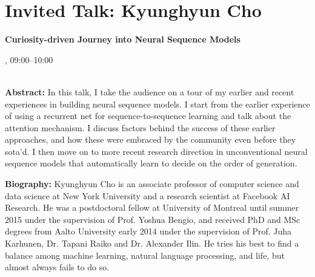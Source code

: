 \section{Invited Talk: Kyunghyun Cho}

\begin{center}
\begin{Large}
    {\bfseries\Large Curiosity-driven Journey into Neural Sequence Models} \vspace{1em}\par
\end{Large}


\daydateyear, 09:00--10:00 \vspace{1em}\\
\PlenaryLoc \\
\vspace{1em}\par
\end{center}

\noindent
{\bfseries Abstract:} In this talk, I take the audience on a tour of my earlier and recent experiences in building neural sequence models. I start from the earlier experience of using a recurrent net for sequence-to-sequence learning and talk about the attention mechanism. I discuss factors behind the success of these earlier approaches, and how these were embraced by the community even before they sota'd. I then move on to more recent research direction in unconventional neural sequence models that automatically learn to decide on the order of generation.
\vspace{3em}\par 

\vfill
\noindent

{\bfseries Biography:} Kyunghyun Cho is an associate professor of computer science and data science at New York University and a research scientist at Facebook AI Research. He was a postdoctoral fellow at University of Montreal until summer 2015 under the supervision of Prof. Yoshua Bengio, and received PhD and MSc degrees from Aalto University early 2014 under the supervision of Prof. Juha Karhunen, Dr. Tapani Raiko and Dr. Alexander Ilin. He tries his best to find a balance among machine learning, natural language processing, and life, but almost always fails to do so.

\newpage
